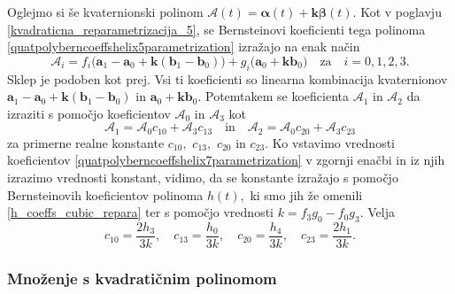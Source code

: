 \documentclass[12pt,a4paper,twoside]{article}
\theoremstyle{definition} %
\theoremstyle{plain} %
\numberwithin{equation}{section}  %
\newcommand{\aV}{\mathbf{a}}
\newcommand{\bV}{\mathbf{b}}
\newcommand{\kV}{\mathbf{k}}
\newcommand{\AQ}{\mathcal{A}}
\newcommand{\balpha}{\boldsymbol \alpha}
\newcommand{\bbeta}{\boldsymbol \beta}
\begin{document}
Oglejmo si še kvaternionski polinom $\AQ(t)=\balpha(t)+\kV\bbeta(t).$ Kot v poglavju \ref{kvadraticna_reparametrizacija_5}, se Bernsteinovi koeficienti tega polinoma \eqref{quatpolyberncoeffshelix5parametrization} izražajo na enak način
\begin{equation}
	\label{quatpolyberncoeffshelix7parametrization}
	\AQ_i=f_i\big(\aV_1-\aV_0+\kV(\bV_1-\bV_0)\big)+g_i\big(\aV_0+\kV\bV_0\big)\quad\text{za}\quad i=0,1,2,3.
\end{equation}
Sklep je podoben kot prej. Vsi ti koeficienti so linearna kombinacija kvaternionov $\aV_1-\aV_0+\kV(\bV_1-\bV_0)$ in $\aV_0+\kV\bV_0$. Potemtakem se koeficienta $\AQ_1$ in $\AQ_2$ da izraziti s pomočjo koeficientov $\AQ_0$ in $\AQ_3$ kot
\begin{equation*}
	\AQ_1=\AQ_0c_{10}+\AQ_3c_{13}\quad\text{in}\quad\AQ_2=\AQ_0c_{20}+\AQ_3c_{23}
\end{equation*}
za primerne realne konstante $c_{10},$ $c_{13},$ $c_{20}$ in $c_{23}.$ Ko vstavimo vrednosti koeficientov \eqref{quatpolyberncoeffshelix7parametrization} v zgornji enačbi in iz njih izrazimo vrednosti konstant, vidimo, da se konstante izražajo s pomočjo Bernsteinovih koeficientov polinoma $h(t),$ ki smo jih že omenili \eqref{h_coeffs_cubic_repara} ter s pomočjo vrednosti $k=f_3g_0-f_0g_3.$ Velja
\begin{equation*}
	c_{10}=\frac{2h_3}{3k},\quad c_{13}=\frac{h_0}{3k},\quad c_{20}=\frac{h_4}{3k},\quad c_{23}=\frac{2h_1}{3k}.
\end{equation*}

\subsubsection{Množenje s kvadratičnim polinomom}
\label{mnozenje_kvadraticni_polinom_7}
\end{document}

